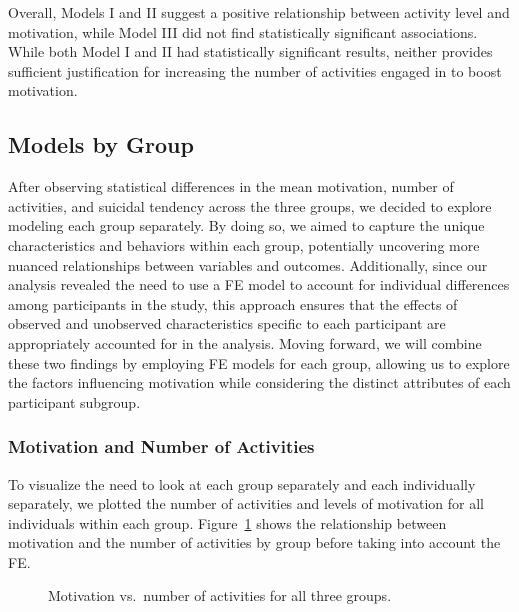 \documentclass[
  letterpaper,
  number,
  review,
  3p]{elsarticle}
\begin{document}
Overall, Models I and II suggest a positive relationship between
activity level and motivation, while Model III did not find
statistically significant associations. While both Model I and II had
statistically significant results, neither provides sufficient
justification for increasing the number of activities engaged in to
boost motivation.

\subsection{Models by Group}\label{models-by-group}

After observing statistical differences in the mean motivation, number
of activities, and suicidal tendency across the three groups, we decided
to explore modeling each group separately. By doing so, we aimed to
capture the unique characteristics and behaviors within each group,
potentially uncovering more nuanced relationships between variables and
outcomes. Additionally, since our analysis revealed the need to use a FE
model to account for individual differences among participants in the
study, this approach ensures that the effects of observed and unobserved
characteristics specific to each participant are appropriately accounted
for in the analysis. Moving forward, we will combine these two findings
by employing FE models for each group, allowing us to explore the
factors influencing motivation while considering the distinct attributes
of each participant subgroup.

\subsubsection{Motivation and Number of
Activities}\label{motivation-and-number-of-activities}

To visualize the need to look at each group separately and each
individually separately, we plotted the number of activities and levels
of motivation for all individuals within each group.
Figure~\ref{fig-Analy} shows the relationship between motivation and the
number of activities by group before taking into account the FE.

\begin{figure}[H]


\caption{\label{fig-Analy}Motivation vs.~number of activities for all
three groups.}

\end{figure}%
\end{document}
